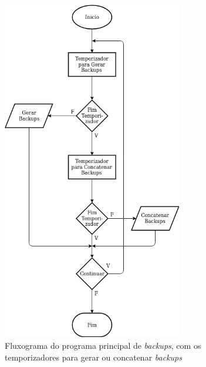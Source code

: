 \documentclass[11pt,twoside,a4paper]{report}
\begin{document}
\begin{figure}[H]
	\begin{center}
		\includegraphics[width=0.7\textwidth]{fluxograma_backups_programa01} %
		\caption[Fluxograma do programa principal de \textit{backups}]{Fluxograma do programa principal de \textit{backups}, com os temporizadores para gerar ou concatenar \textit{backups}}
		\label{fig:backups_programa}
	\end{center}
\end{figure}
\end{document}
